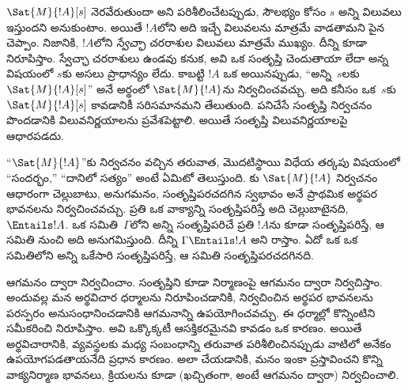 \documentclass[../../../include/open-logic-section]{subfiles}
\begin{document}


$\Sat{M}{!A}[s]$ నెరవేరుతుందా అని పరిశీలించేటప్పుడు, సౌలభ్యం కోసం $s$
అన్ని  విలువలు ఇస్తుందని అనుకుంటాం. అయితే
$!A$లోని  అది ఇచ్చే విలువలను మాత్రమే వాడతామని
పైన చెప్పాం. నిజానికి, $!A$లోని \emph{స్వేచ్ఛా} చరరాశుల విలువలు
మాత్రమే ముఖ్యం. దీన్ని కూడా
నిరూపిస్తాం.  స్వేచ్ఛా చరరాశులు ఉండవు కనుక, అవి ఒక
 సంతృప్తి చెందుతాయా లేదా అన్న విషయంలో $s$కు అసలు
ప్రాధాన్యం లేదు. కాబట్టి $!A$ ఒక  అయినప్పుడు,
``అన్ని~$s$లకు $\Sat{M}{!A}[s]$'' అనే అర్థంలో $\Sat{M}{!A}$ను
నిర్వచించవచ్చు. అది కనీసం ఒక~$s$కు $\Sat{M}{!A}[s]$ కావడానికీ
సరిసమానమని తేలుతుంది.  పనిచేసే సంతృప్తి నిర్వచనం
పొందడానికి  విలువనిర్ణయాలను ప్రవేశపెట్టాలి. అయితే
 సంతృప్తి  విలువనిర్ణయాలపై ఆధారపడదు.

``$\Sat{M}{!A}$''కు నిర్వచనం వచ్చిన తరువాత, మొదటిస్థాయి విధేయ తర్కపు
 విషయంలో ``సందర్భం,'' ``దానిలో సత్యం'' అంటే ఏమిటో
తెలుస్తుంది. కు $\Sat{M}{!A}$ నిర్వచనం ఆధారంగా
చెల్లుబాటు, అనుగమనం, సంతృప్తిపరచదగిన స్వభావం అనే ప్రాథమిక అర్థపర
భావనలను నిర్వచించవచ్చు. ప్రతి  ఒక వాక్యాన్ని
సంతృప్తిపరిస్తే అది చెల్లుబాటైనది, $\Entails !A$. ఒక
 సమితి~$\Gamma$లోని అన్ని 
సంతృప్తిపరిచే ప్రతి  $!A$ను కూడా సంతృప్తిపరిస్తే,
ఆ సమితి నుంచి అది అనుగమిస్తుంది. దీన్ని $\Gamma \Entails !A$ అని రాస్తాం. ఏదో ఒక
 ఒక  సమితిలోని అన్ని 
ఒకేసారి సంతృప్తిపరిస్తే, ఆ సమితి సంతృప్తిపరచదగినది.

 ఆగమనం ద్వారా నిర్వచించాం. సంతృప్తిని కూడా
 నిర్మాణంపై ఆగమనం ద్వారా నిర్వచిస్తాం. అందువల్ల మన
అర్థవిచార ధర్మాలను నిరూపించడానికి, నిర్వచించిన అర్థపర భావనలను
పరస్పరం అనుసంధానించడానికి ఆగమనాన్ని ఉపయోగించవచ్చు. ఈ ధర్మాల్లో
కొన్నింటిని సమీకరించి నిరూపిస్తాం. అవి ఒక్కొక్కటీ ఆసక్తికరమైనవి
కావడం ఒక కారణం. అయితే అర్థవిచారానికి,  వ్యవస్థలకు
మధ్య సంబంధాన్ని తరువాత పరిశీలించినప్పుడు వాటిలో అనేకం ఉపయోగపడతాయనేది
ప్రధాన కారణం. అలా చేయడానికి, మనం ఇంకా ప్రస్తావించని కొన్ని
వాక్యనిర్మాణ భావనలు, క్రియలను కూడా (ఖచ్చితంగా, అంటే ఆగమనం ద్వారా)
నిర్వచించాలి.
\end{document}

